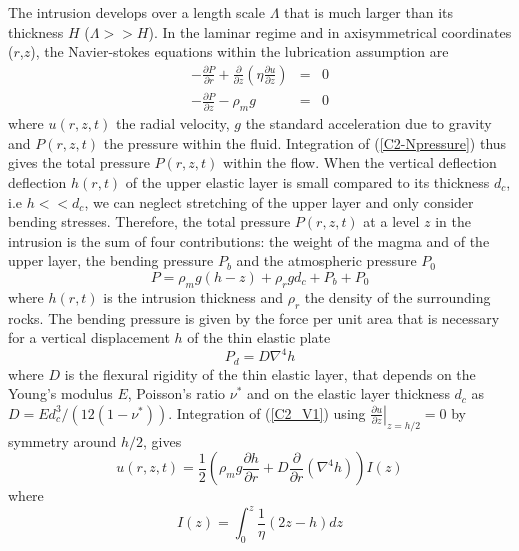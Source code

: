The  intrusion develops  over a  length scale  $\Lambda$ that  is much
larger than its thickness $H$ ($\Lambda >> H$).  In the laminar regime
and  in   axisymmetrical  coordinates  ($r$,$z$),   the  Navier-stokes
equations within the lubrication assumption are
\begin{eqnarray}
  -\frac{\partial P}{\partial r}  +  \frac{\partial}{\partial z}\left(\eta \frac{\partial u}{\partial z}\right) &=&0\label{C2_V1} \\
  -\frac{\partial P}{\partial z}  - \rho_{m}g&  =&0\label{C2-Npressure}
\end{eqnarray}
where $u(r,z,t)$  the radial  velocity, $g$ the  standard acceleration
due  to  gravity  and  $P(r,z,t)$   the  pressure  within  the  fluid.
Integration  of (\ref{C2-Npressure})  thus  gives  the total  pressure
$P(r,z,t)$ within  the flow.  When the  vertical deflection deflection
$h(r,t)$ of the upper elastic layer is small compared to its thickness
$d_c$, i.e $h<<d_c$, we can neglect  stretching of the upper layer and
only  consider   bending  stresses.  Therefore,  the   total  pressure
$P(r,z,t)$  at  a level  $z$  in  the intrusion  is  the  sum of  four
contributions: the  weight of the  magma and  of the upper  layer, the
bending pressure $P_b$ and the atmospheric pressure $P_0$
\begin{equation}
  P = \rho_m g (h-z)+\rho_rgd_c+P_b+P_0
\end{equation}
where $h(r,t)$ is the intrusion  thickness and $\rho_r$ the density of
the surrounding rocks. The bending pressure  is given by the force per
unit area  that is necessary  for a  vertical displacement $h$  of the
thin elastic plate \citep{Turcotte:1982ca}
\begin{equation}
  P_d = D\nabla^4h
\end{equation}
where $D$  is the flexural  rigidity of  the thin elastic  layer, that
depends on the Young's modulus $E$, Poisson's ratio $\nu^*$ and on the
elastic           layer          thickness           $d_c$          as
$D =  Ed_c^3/\left(12(1-\nu^*)\right)$.  Integration  of (\ref{C2_V1})
using   $\left.\frac{\partial   u}{\partial  z}\right|_{z=h/2}=0$   by
symmetry around $h/2$, gives
\begin{equation}
  u(r,z,t)=\frac{1}{2}\left(\rho_m g \frac{\partial h}{\partial      r}+D\frac{\partial}{\partial      r}\left(\nabla^4h\right)\right)I(z)
  \label{C2-V2}
\end{equation}
where
\begin{equation}
  I(z) = \int_0^z  \frac{1}{\eta}\left( 2 z -h\right)dz
\end{equation}
